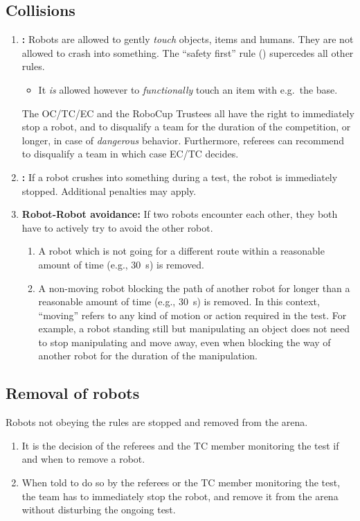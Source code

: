\subsection{Collisions}
\begin{enumerate}
	\item \textbf{:} Robots are allowed to gently \emph{touch} objects, items and humans. 	They are not allowed to crash into something. The \enquote{safety first} rule () supercedes all other rules.
	\begin{itemize}
		\item It \emph{is} allowed however to \emph{functionally} touch an item with e.g.~the base.
	\end{itemize}
	The OC/TC/EC and the RoboCup Trustees all have the right to immediately stop a robot, and to disqualify a team for the duration of the competition, or longer, in case of \emph{dangerous} behavior. Furthermore, referees can recommend to disqualify a team in which case EC/TC decides.
	\item \textbf{:} If a robot crushes into something during a test, the robot is immediately stopped.	Additional penalties may apply.
	\item \textbf{Robot-Robot avoidance:} If two robots encounter each other, they both have to actively try to avoid the other robot.
	\begin{enumerate}
		\item A robot which is not going for a different route within a reasonable amount of time (e.g., \SI{30}{\second}) is removed.
		\item A non-moving robot blocking the path of another robot for longer than a reasonable amount of time (e.g., \SI{30}{\second}) is removed. In this context, \enquote{moving} refers to any kind of motion or action required in the test. For example, a robot standing still but manipulating an object does not need to stop manipulating and move away, even when blocking the way of another robot for the duration of the manipulation.
	\end{enumerate}
\end{enumerate}



\subsection{Removal of robots}
\label{rule:robot_removal}
Robots not obeying the rules are stopped and removed from the arena.
\begin{enumerate}
	\item It is the decision of the referees and the TC member monitoring the test if and when to remove a robot.
	\item When told to do so by the referees or the TC member monitoring the test, the team has to immediately stop the robot, and remove it from the arena without disturbing the ongoing test.
\end{enumerate}


